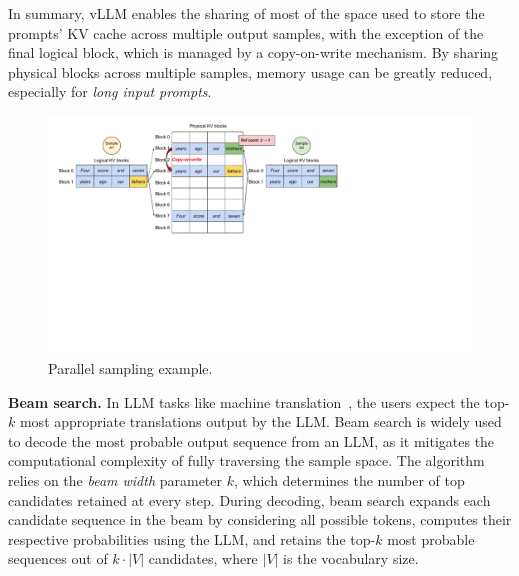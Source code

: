 \documentclass[sigplan,10pt]{acmart}
\newcommand{\sys}[0]{vLLM\xspace}
\newcommand{\heading}[1]{\vspace{4pt}\noindent\textbf{#1}}
\begin{document}
In summary, \sys enables the sharing of most of the space used to store the prompts' KV cache across multiple output samples, with the exception of the final logical block, which is managed by a copy-on-write mechanism. By sharing physical blocks across multiple samples, memory usage can be greatly reduced, especially for \emph{long input prompts}. 

\begin{figure}
    \centering
    \includegraphics[width=\columnwidth]{figures/parallel-decoding.pdf}
    \vspace{-15pt}
    \caption{Parallel sampling example.}
    \label{fig:parallel-decoding}
    \vspace{-15pt}
\end{figure}

\heading{Beam search.} In LLM tasks like machine translation~\cite{wu2016google}, the users expect the top-$k$ most appropriate translations output by the LLM. Beam search \cite{sutskever2014sequence} is widely used to decode the most probable output sequence from an LLM, as it mitigates the computational complexity of fully traversing the sample space.
The algorithm relies on the \emph{beam width} parameter $k$, which determines the number of top candidates retained at every step. During decoding, beam search expands each candidate sequence in the beam by considering all possible tokens, computes their respective probabilities using the LLM, and retains the top-$k$ most probable sequences out of $k \cdot |V|$ candidates, where $|V|$ is the vocabulary size.
\end{document}
